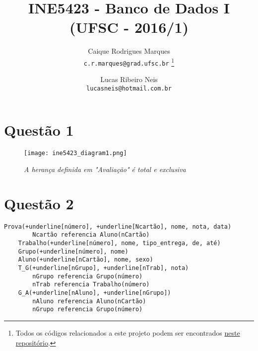 \documentclass[fleqn]{article}
\title{\textbf{INE5423 - Banco de Dados I (UFSC - 2016/1)}}
\author{
    Caique Rodrigues Marques \\
    {\texttt{c.r.marques@grad.ufsc.br}}
    \thanks{Todos os códigos relacionados a este projeto podem ser encontrados
    \href{https://github.com/mrcaique/ufsc-ine5423}{neste repositório}.}
    \and
    Lucas Ribeiro Neis \\
    {\texttt{lucasneis@hotmail.com.br}}
    \vspace{-5mm}
}
\date{}
\begin{document}
\maketitle

\section*{Questão 1}
    \begin{figure*}[h!]
        \centering
        \texttt{[image: ine5423\_diagram1.png]}
        \caption*{\textit{A herança definida em "Avaliação" é total e exclusiva}}
    \end{figure*}
    
\section*{Questão 2}
    \begin{Verbatim}[commandchars=+\[\]]
    Prova(+underline[número], +underline[Ncartão], nome, nota, data)
        Ncartão referencia Aluno(nCartão)
    Trabalho(+underline[número], nome, tipo_entrega, de, até)
    Grupo(+underline[número], nome)
    Aluno(+underline[nCartão], nome, sexo)
    T_G(+underline[nGrupo], +underline[nTrab], nota)
        nGrupo referencia Grupo(número)
        nTrab referencia Trabalho(número)
    G_A(+underline[nAluno], +underline[nGrupo])
        nAluno referencia Aluno(nCartão)
        nGrupo referencia Grupo(número)
    \end{Verbatim}

\newpage
\end{document}
